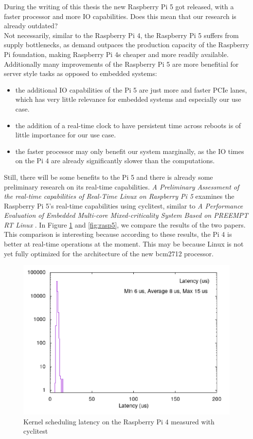 During the writing of this thesis the new Raspberry Pi 5 got released, with a faster processor and more IO capabilities.
Does this mean that our research is already outdated?\\
Not necessarily, similar to the Raspberry Pi 4, the Raspberry Pi 5 suffers from supply bottlenecks,
as demand outpaces the production capacity of the Raspberry Pi foundation, making Raspberry Pi 4s cheaper and more readily available.
Additionally many improvements of the Raspberry Pi 5 are more benefitial for server style tasks as opposed to embedded systems:
\begin{itemize}
  \item the additional IO capabilities of the Pi 5 are just more and faster PCIe lanes, which has very little relevance for embedded systems and especially our use case.
  \item the addition of a real-time clock to have persistent time across reboots is of little importance for our use case.
  \item the faster processor may only benefit our system marginally, as the IO times on the Pi 4 are already significantly slower than the computations.
\end{itemize}

Still, there will be some benefits to the Pi 5 and there is already some preliminary research on its real-time capabilities.
\textit{A Preliminary Assessment of the real-time capabilities of Real-Time Linux on Raspberry Pi 5} \cite{Rasp5} examines the Raspberry Pi 5's real-time capabilities using cyclitest,
similar to \textit{A Performance Evaluation of Embedded Multi-core Mixed-criticality System Based on PREEMPT RT Linux} \cite{Rasp4}.
In Figure \ref{fig:rasp4} and \ref{fig:rasp5}, we compare the results of the two papers.
This comparison is interesting because according to these results, the Pi 4 is better at real-time operations at the moment.
This may be because Linux is not yet fully optimized for the architecture of the new bcm2712 processor.

\begin{figure}
  \begin{center}
    \includegraphics[width=.8\textwidth]{assets/Rasp4.png}
    \caption{Kernel scheduling latency on the Raspberry Pi 4 measured with cyclitest \cite{Rasp4}}
    \label{fig:rasp4}
  \end{center}
\end{figure}

